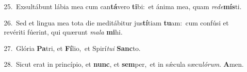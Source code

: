 {\numbfont\textcolor{\numbcolor}{25.}}~Exsultábunt lábia mea cum can\-\textbf{tá}\-vero \textbf{ti}\-bi:~\star et ánima mea, quam \textit{red}\-\textit{e}\textbf{mís}ti.\par
{\numbfont\textcolor{\numbcolor}{26.}}~Sed et lingua mea tota die meditábitur jus\-\textbf{tí}\-tiam \textbf{tu}\-am:~\star cum confúsi et revériti fúerint, qui quærunt \textit{ma}\-\textit{la} \textbf{mi}\-hi.\par
{\numbfont\textcolor{\numbcolor}{27.}}~Glória \textbf{Pa}\-tri, et \textbf{Fí}\-lio,~\star et Spirí\-\textit{tu}\-\textit{i} \textbf{Sanc}\-to.\par
{\numbfont\textcolor{\numbcolor}{28.}}~Sicut erat in princípio, et \textbf{nunc}\-, et \textbf{sem}\-per,~\star et in sǽcula sæcu\-\textit{ló}\-\textit{rum}. \textbf{A}\-men.\par
